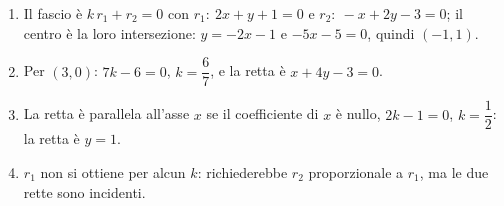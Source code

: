 \documentclass[10pt,a4paper]{article}
\newcommand{\esercizio}[1]{\needspace{10\baselineskip}\par\vspace{1em}{\large\bfseries Esercizio #1}\par}
\begin{document}
\esercizio{4}
\begin{enumerate}
\item Il fascio è $k\,r_1+r_2=0$ con $r_1:\ 2x+y+1=0$ e $r_2:\ -x+2y-3=0$; il centro è la loro intersezione: $y=-2x-1$ e $-5x-5=0$, quindi $(-1,1)$.
\item Per $(3,0)$: $7k-6=0$, $k=\dfrac67$, e la retta è $x+4y-3=0$.
\item La retta è parallela all'asse $x$ se il coefficiente di $x$ è nullo, $2k-1=0$, $k=\dfrac12$: la retta è $y=1$.
\item $r_1$ non si ottiene per alcun $k$: richiederebbe $r_2$ proporzionale a $r_1$, ma le due rette sono incidenti.
\end{enumerate}
\end{document}
